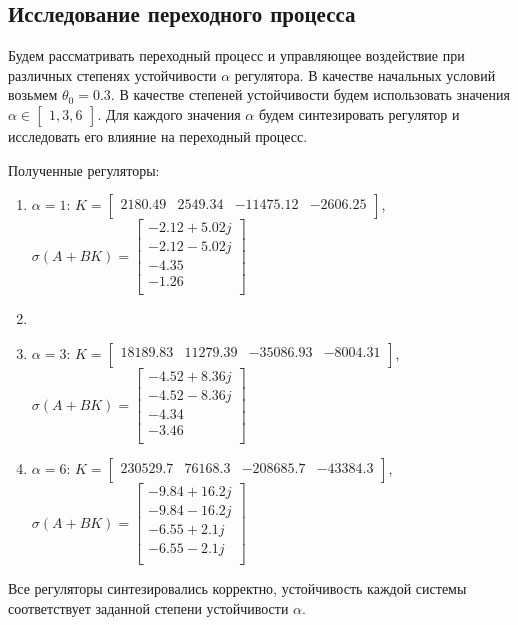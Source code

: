 \subsection{Исследование переходного процесса} 
Будем рассматривать переходный процесс и управляющее воздействие при различных степенях устойчивости $\alpha$ регулятора. 
В качестве начальных условий возьмем $\theta_0 = 0.3$. В качестве степеней устойчивости будем использовать 
значения $\alpha \in \begin{bmatrix} 1, 3, 6\end{bmatrix}$. Для каждого значения $\alpha$ будем 
синтезировать регулятор и исследовать его влияние на переходный процесс. 

Полученные регуляторы: 
\begin{enumerate}
    \item $\alpha = 1$: $K = \begin{bmatrix} 2180.49  & 2549.34  & -11475.12  & -2606.25 \\ \end{bmatrix}$, $\sigma(A + BK) = \begin{bmatrix} -2.12 + 5.02j \\ -2.12 - 5.02j \\ -4.35 \\ -1.26 \\  \end{bmatrix}$
    \item \item $\alpha = 3$: $K = \begin{bmatrix} 18189.83  & 11279.39  & -35086.93  & -8004.31 \\ \end{bmatrix}$, $\sigma(A + BK) = \begin{bmatrix} -4.52 + 8.36j \\ -4.52 - 8.36j \\ -4.34 \\ -3.46 \\  \end{bmatrix}$
    \item $\alpha = 6$: $K = \begin{bmatrix} 230529.7  & 76168.3  & -208685.7  & -43384.3 \\ \end{bmatrix}$, $\sigma(A + BK) = \begin{bmatrix} -9.84 + 16.2j \\ -9.84 - 16.2j \\ -6.55 + 2.1j \\ -6.55 - 2.1j \\ \end{bmatrix}$
\end{enumerate}
Все регуляторы синтезировались корректно, устойчивость каждой системы соответствует заданной степени устойчивости $\alpha$. 

